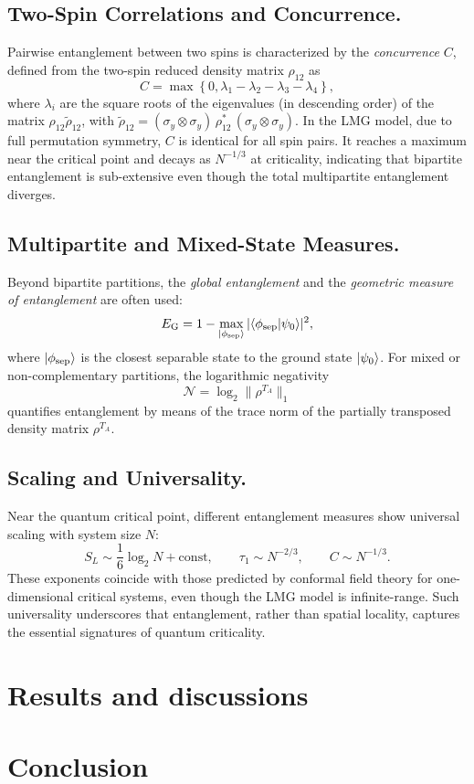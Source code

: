 \documentclass[twocolumn,superscriptaddress,unsortedaddress,nofootinbib,amsmath,amssymb,
aps,floatfix]{revtex4-2}
\begin{document}
\subsection{Two-Spin Correlations and Concurrence.}
Pairwise entanglement between two spins is characterized by the \emph{concurrence} $C$,
defined from the two-spin reduced density matrix $\rho_{12}$ as
\begin{equation}
  C = \max \left\{ 0, \lambda_1 - \lambda_2 - \lambda_3 - \lambda_4 \right\},
\end{equation}
where $\lambda_i$ are the square roots of the eigenvalues (in descending order)
of the matrix $\rho_{12} \tilde{\rho}_{12}$, with
$\tilde{\rho}_{12} = (\sigma_y \otimes \sigma_y)\, \rho_{12}^*\, (\sigma_y \otimes \sigma_y)$.
In the LMG model, due to full permutation symmetry, $C$ is identical for all spin pairs.
It reaches a maximum near the critical point and decays as $N^{-1/3}$ at criticality,
indicating that bipartite entanglement is sub-extensive even though the total
multipartite entanglement diverges.

\subsection{Multipartite and Mixed-State Measures.}
Beyond bipartite partitions, the \emph{global entanglement} and the
\emph{geometric measure of entanglement} are often used:
\begin{equation}
  E_{\mathrm{G}} = 1 - \max_{\ket{\phi_{\mathrm{sep}}}} |\langle \phi_{\mathrm{sep}} | \psi_0 \rangle|^2,
\end{equation}
where $\ket{\phi_{\mathrm{sep}}}$ is the closest separable state to the ground state $\ket{\psi_0}$.
For mixed or non-complementary partitions, the logarithmic negativity
\begin{equation}
  \mathcal{N} = \log_2 \| \rho^{T_A} \|_1
\end{equation}
quantifies entanglement by means of the trace norm of the partially transposed density matrix $\rho^{T_A}$.

\subsection{Scaling and Universality.}
Near the quantum critical point, different entanglement measures show universal scaling with system size $N$:
\begin{equation}
  S_L \sim \frac{1}{6} \log_2 N + \mathrm{const}, \qquad
  \tau_1 \sim N^{-2/3}, \qquad
  C \sim N^{-1/3}.
\end{equation}
These exponents coincide with those predicted by conformal field theory
for one-dimensional critical systems, even though the LMG model is infinite-range.
Such universality underscores that entanglement, rather than spatial locality,
captures the essential signatures of quantum criticality.

\section{Results and discussions}


\section{Conclusion}

%
\end{document}
